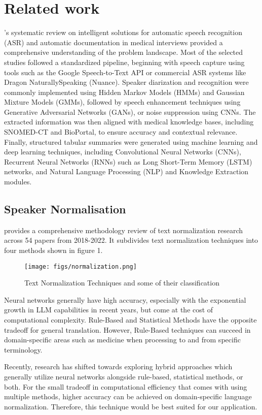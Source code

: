 \documentclass[11pt,a4paper]{article}
\begin{document}
\section{Related work}
\cite{SR}'s systematic review on intelligent solutions for automatic speech recognition (ASR) and automatic documentation in medical interviews provided a comprehensive understanding of the problem landscape. Most of the selected studies followed a standardized pipeline, beginning with speech capture using tools such as the Google Speech-to-Text API or commercial ASR systems like Dragon NaturallySpeaking (Nuance). Speaker diarization and recognition were commonly implemented using Hidden Markov Models (HMMs) and Gaussian Mixture Models (GMMs), followed by speech enhancement techniques using Generative Adversarial Networks (GANs), or noise suppression using CNNs. The extracted information was then aligned with medical knowledge bases, including SNOMED-CT and BioPortal, to ensure accuracy and contextual relevance. Finally, structured tabular summaries were generated using machine learning and deep learning techniques, including Convolutional Neural Networks (CNNs), Recurrent Neural Networks (RNNs) such as Long Short-Term Memory (LSTM) networks, and Natural Language Processing (NLP) and Knowledge Extraction modules.

\subsection*{Speaker Normalisation}
\cite{aliero2023systematic} provides a comprehensive methodology review of text normalization research across 54 papers from 2018-2022. It subdivides text normalization techniques into four methods shown in figure 1.
\begin{figure}
    \centering
    \texttt{[image: figs/normalization.png]}
    \caption{Text Normalization Techniques and some of their classification}
    \label{fig:enter-label}
\end{figure}
Neural networks generally have high accuracy, especially with the exponential growth in LLM capabilities in recent years, but come at the cost of computational complexity. Rule-Based and Statistical Methods have the opposite tradeoff for general translation. However, Rule-Based techniques can succeed in domain-specific areas such as medicine when processing to and from specific terminology. 
\par
Recently, research has shifted towards exploring hybrid approaches which generally utilize neural networks alongside rule-based, statistical methods, or both. For the small tradeoff in computational efficiency that comes with using multiple methods, higher accuracy can be achieved on domain-specific language normalization. Therefore, this technique would be best suited for our application.
\end{document}
